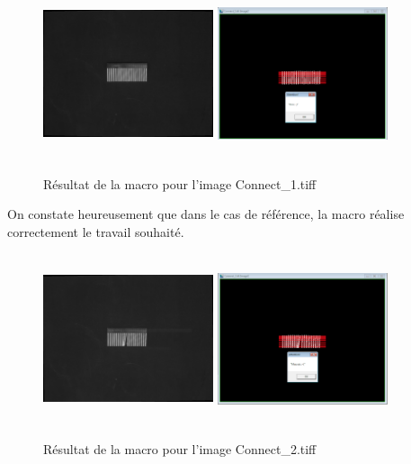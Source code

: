 \documentclass{scrreprt}
\begin{document}
\begin{figure}[!h]
\centering
\includegraphics[width=5cm, height=5cm]{images/Connect1o.png}\hfill
\includegraphics[width=5cm, height=5cm]{images/connecteur1.png}
\caption{Résultat de la macro pour l'image Connect_1.tiff}
\end{figure}

On constate heureusement que dans le cas de référence, la macro réalise correctement le travail souhaité. 

\newpage
\begin{figure}[!h]
\centering
\includegraphics[width=5cm, height=5cm]{images/Connect2o.png}\hfill
\includegraphics[width=5cm, height=5cm]{images/connecteur2.png}
\caption{Résultat de la macro pour l'image Connect_2.tiff}
\end{figure} 
\end{document}
